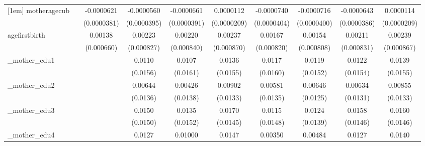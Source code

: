 \begin{table}[htbp]
\begin{tabular}{l*{9}{c}}
[1em]
motheragecub&                     &  -0.0000621         &  -0.0000560         &  -0.0000661\sym{*}  &   0.0000112         &  -0.0000740\sym{*}  &  -0.0000716\sym{*}  &  -0.0000643\sym{*}  &   0.0000114         \\
            &                     & (0.0000381)         & (0.0000395)         & (0.0000391)         & (0.0000209)         & (0.0000404)         & (0.0000400)         & (0.0000386)         & (0.0000209)         \\
[1em]
agefirstbirth&                     &     0.00138\sym{**} &     0.00223\sym{***}&     0.00220\sym{***}&     0.00237\sym{***}&     0.00167\sym{**} &     0.00154\sym{*}  &     0.00211\sym{**} &     0.00239\sym{***}\\
            &                     &  (0.000660)         &  (0.000827)         &  (0.000840)         &  (0.000870)         &  (0.000820)         &  (0.000808)         &  (0.000831)         &  (0.000867)         \\
[1em]
\_mother\_edu1&                     &                     &      0.0110         &      0.0107         &      0.0136         &      0.0117         &      0.0119         &      0.0122         &      0.0139         \\
            &                     &                     &    (0.0156)         &    (0.0161)         &    (0.0155)         &    (0.0160)         &    (0.0152)         &    (0.0154)         &    (0.0155)         \\
[1em]
\_mother\_edu2&                     &                     &     0.00644         &     0.00426         &     0.00902         &     0.00581         &     0.00646         &     0.00634         &     0.00855         \\
            &                     &                     &    (0.0136)         &    (0.0138)         &    (0.0133)         &    (0.0135)         &    (0.0125)         &    (0.0131)         &    (0.0133)         \\
[1em]
\_mother\_edu3&                     &                     &      0.0150         &      0.0135         &      0.0170         &      0.0115         &      0.0124         &      0.0158         &      0.0160         \\
            &                     &                     &    (0.0150)         &    (0.0152)         &    (0.0145)         &    (0.0148)         &    (0.0139)         &    (0.0146)         &    (0.0146)         \\
[1em]
\_mother\_edu4&                     &                     &      0.0127         &     0.01000         &      0.0147         &     0.00350         &     0.00484         &      0.0127         &      0.0140         \\

\end{tabular}
\end{table}
